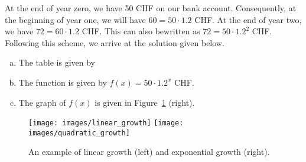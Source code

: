 \begin{solution*}
	At the end of year zero, we have 50 CHF on our bank account.
	Consequently, at the beginning of year one, we will have $60=50\cdot 1.2$ CHF.
	At the end of year two, we have $72=60\cdot 1.2$ CHF.
	This can also bewritten as $72=50\cdot 1.2^2$ CHF.
	Following this scheme, we arrive at the solution given below.
	\begin{enumerate}[a)]
		\item The table is given by
		\begin{figure}[ht]
			\centering
		\end{figure}
		\item The function is given by $f\left(x\right)=50\cdot 1.2^x$ CHF.
		\item The graph of $f\left(x\right)$ is given in Figure~\ref{fig:linear_exponential_growth} (right).
	\end{enumerate}
\end{solution*}
\begin{figure}[ht]
	\centering
	\texttt{[image: images/linear\_growth]}\hfill
	\texttt{[image: images/quadratic\_growth]}
	\caption{An example of linear growth (left) and exponential growth (right).}
	\label{fig:linear_exponential_growth}
\end{figure}
